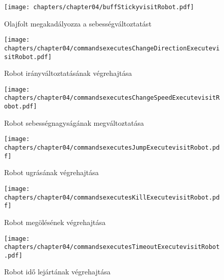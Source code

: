 \begin{figure}[h]
	\begin{center}
		\texttt{[image: chapters/chapter04/buffStickyvisitRobot.pdf]}
		\caption{Olajfolt megakadályozza a sebességváltoztatást}
		\label{fig:buff.Sticky.visit}
	\end{center}
\end{figure}

\begin{figure}[h]
	\begin{center}
		\texttt{[image: chapters/chapter04/commandsexecutesChangeDirectionExecutevisitRobot.pdf]}
		\caption{Robot irányváltoztatásának végrehajtása}
		\label{fig:command.executes.ChangeDirectionExecute.visit}
	\end{center}
\end{figure}

\begin{figure}[h]
	\begin{center}
		\texttt{[image: chapters/chapter04/commandsexecutesChangeSpeedExecutevisitRobot.pdf]}
		\caption{Robot sebességnagyságának megváltoztatása}
		\label{fig:command.executes.ChangeSpeedExecute.visit}
	\end{center}
\end{figure}

\begin{figure}[h]
	\begin{center}
		\texttt{[image: chapters/chapter04/commandsexecutesJumpExecutevisitRobot.pdf]}
		\caption{Robot ugrásának végrehajtása}
		\label{fig:command.executes.JumpExecute.visit}
	\end{center}
\end{figure}

\begin{figure}[h]
	\begin{center}
		\texttt{[image: chapters/chapter04/commandsexecutesKillExecutevisitRobot.pdf]}
		\caption{Robot megölésének végrehajtása}
		\label{fig:command.executes.KillExecute.visit}
	\end{center}
\end{figure}

\begin{figure}[h]
	\begin{center}
		\texttt{[image: chapters/chapter04/commandsexecutesTimeoutExecutevisitRobot.pdf]}
		\caption{Robot idő lejártának végrehajtása}
		\label{fig:command.executes.TimeoutExecute.visit}
	\end{center}
\end{figure}

